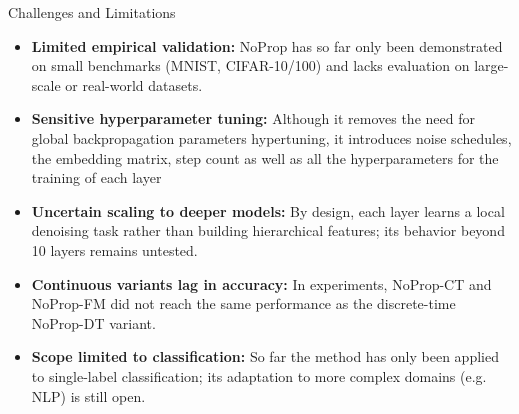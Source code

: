 \documentclass{beamer}
\begin{document}
\begin{frame}{Challenges and Limitations}
  \begin{itemize}
    \item \textbf{Limited empirical validation:} NoProp has so far only been demonstrated on small benchmarks (MNIST, CIFAR-10/100) and lacks evaluation on large-scale or real-world datasets.
    \item \textbf{Sensitive hyperparameter tuning:} Although it removes the need for global backpropagation parameters hypertuning, it introduces noise schedules, the embedding matrix, step count as well as all the hyperparameters for the training of each layer
    \item \textbf{Uncertain scaling to deeper models:} By design, each layer learns a local denoising task rather than building hierarchical features; its behavior beyond 10 layers remains untested.
    \item \textbf{Continuous variants lag in accuracy:} In experiments, NoProp-CT and NoProp-FM did not reach the same performance as the discrete-time NoProp-DT variant.
    \item \textbf{Scope limited to classification:} So far the method has only been applied to single-label classification; its adaptation to more complex domains (e.g. NLP) is still open.
  \end{itemize}
\end{frame}
\end{document}
